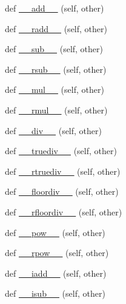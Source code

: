 \begin{DoxyCompactItemize}
\item 
def \hyperlink{classnumpy_1_1ma_1_1core_1_1MaskedArray_a5e0ec7fdd42ee3d912b7942c9f2f83aa}{\+\_\+\+\_\+add\+\_\+\+\_\+} (self, other)
\item 
def \hyperlink{classnumpy_1_1ma_1_1core_1_1MaskedArray_a3919b9154502c32836e460ae0bea0e46}{\+\_\+\+\_\+radd\+\_\+\+\_\+} (self, other)
\item 
def \hyperlink{classnumpy_1_1ma_1_1core_1_1MaskedArray_af28f8c2a2b8aeee6de135604a3d0b163}{\+\_\+\+\_\+sub\+\_\+\+\_\+} (self, other)
\item 
def \hyperlink{classnumpy_1_1ma_1_1core_1_1MaskedArray_a7e8bd70a0762d8ae404577fa39262c8a}{\+\_\+\+\_\+rsub\+\_\+\+\_\+} (self, other)
\item 
def \hyperlink{classnumpy_1_1ma_1_1core_1_1MaskedArray_a8456d55f2d91e760296691714216792e}{\+\_\+\+\_\+mul\+\_\+\+\_\+} (self, other)
\item 
def \hyperlink{classnumpy_1_1ma_1_1core_1_1MaskedArray_a4833b0dcd3d71ddc0c0e81ac73ebe210}{\+\_\+\+\_\+rmul\+\_\+\+\_\+} (self, other)
\item 
def \hyperlink{classnumpy_1_1ma_1_1core_1_1MaskedArray_a29a275b34c0675ace96467e63bc51119}{\+\_\+\+\_\+div\+\_\+\+\_\+} (self, other)
\item 
def \hyperlink{classnumpy_1_1ma_1_1core_1_1MaskedArray_a6a4b174e48acab696fd1eec844dfb17a}{\+\_\+\+\_\+truediv\+\_\+\+\_\+} (self, other)
\item 
def \hyperlink{classnumpy_1_1ma_1_1core_1_1MaskedArray_a1f2677f3dabff36750c7891cd2cbbc75}{\+\_\+\+\_\+rtruediv\+\_\+\+\_\+} (self, other)
\item 
def \hyperlink{classnumpy_1_1ma_1_1core_1_1MaskedArray_a2591f59e92b5ab00173d9e9b6f909256}{\+\_\+\+\_\+floordiv\+\_\+\+\_\+} (self, other)
\item 
def \hyperlink{classnumpy_1_1ma_1_1core_1_1MaskedArray_aa0c262dd12cbf13c1d0d389b6fa84c79}{\+\_\+\+\_\+rfloordiv\+\_\+\+\_\+} (self, other)
\item 
def \hyperlink{classnumpy_1_1ma_1_1core_1_1MaskedArray_a7a4150532fa7de31b168ca88502b235c}{\+\_\+\+\_\+pow\+\_\+\+\_\+} (self, other)
\item 
def \hyperlink{classnumpy_1_1ma_1_1core_1_1MaskedArray_a3ce6e43d0e3670386e6f0085d00dcaac}{\+\_\+\+\_\+rpow\+\_\+\+\_\+} (self, other)
\item 
def \hyperlink{classnumpy_1_1ma_1_1core_1_1MaskedArray_a721643c8de34c633b4c93784472861ef}{\+\_\+\+\_\+iadd\+\_\+\+\_\+} (self, other)
\item 
def \hyperlink{classnumpy_1_1ma_1_1core_1_1MaskedArray_a1456f71be32364b2104b68453b3560ba}{\+\_\+\+\_\+isub\+\_\+\+\_\+} (self, other)

\end{DoxyCompactItemize}
